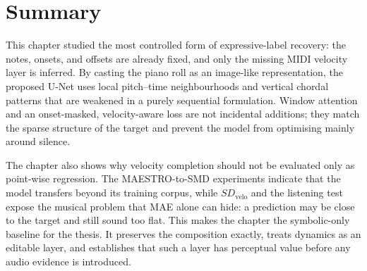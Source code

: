\section{Summary}
\label{sec:velcomp_summary}
This chapter studied the most controlled form of expressive-label recovery: the notes, onsets, and offsets are already fixed, and only the missing MIDI velocity layer is inferred. By casting the piano roll as an image-like representation, the proposed U-Net uses local pitch--time neighbourhoods and vertical chordal patterns that are weakened in a purely sequential formulation. Window attention and an onset-masked, velocity-aware loss are not incidental additions; they match the sparse structure of the target and prevent the model from optimising mainly around silence.

The chapter also shows why velocity completion should not be evaluated only as point-wise regression. The MAESTRO-to-SMD experiments indicate that the model transfers beyond its training corpus, while \(SD_{\mathrm{velo}}\) and the listening test expose the musical problem that MAE alone can hide: a prediction may be close to the target and still sound too flat. This makes the chapter the symbolic-only baseline for the thesis. It preserves the composition exactly, treats dynamics as an editable layer, and establishes that such a layer has perceptual value before any audio evidence is introduced.